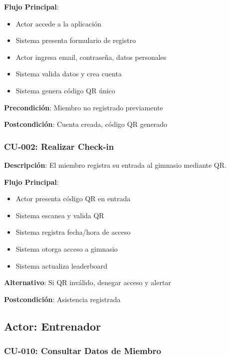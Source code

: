 \documentclass[11pt,a4paper]{article}
\begin{document}
\begin{itemize}
\begin{definicion}
\textbf{Flujo Principal}:
\begin{itemize}
    \item Actor accede a la aplicación
    \item Sistema presenta formulario de registro
    \item Actor ingresa email, contraseña, datos personales
    \item Sistema valida datos y crea cuenta
    \item Sistema genera código QR único
\end{itemize}

\textbf{Precondición}: Miembro no registrado previamente

\textbf{Postcondición}: Cuenta creada, código QR generado
\end{definicion}

\subsubsection{CU-002: Realizar Check-in}

\begin{definicion}
\textbf{Descripción}: El miembro registra su entrada al gimnasio mediante QR.

\textbf{Flujo Principal}:
\begin{itemize}
    \item Actor presenta código QR en entrada
    \item Sistema escanea y valida QR
    \item Sistema registra fecha/hora de acceso
    \item Sistema otorga acceso a gimnasio
    \item Sistema actualiza leaderboard
\end{itemize}

\textbf{Alternativo}: Si QR inválido, denegar acceso y alertar

\textbf{Postcondición}: Asistencia registrada
\end{definicion}

\subsection{Actor: Entrenador}

\subsubsection{CU-010: Consultar Datos de Miembro}


\end{itemize}
\end{document}
